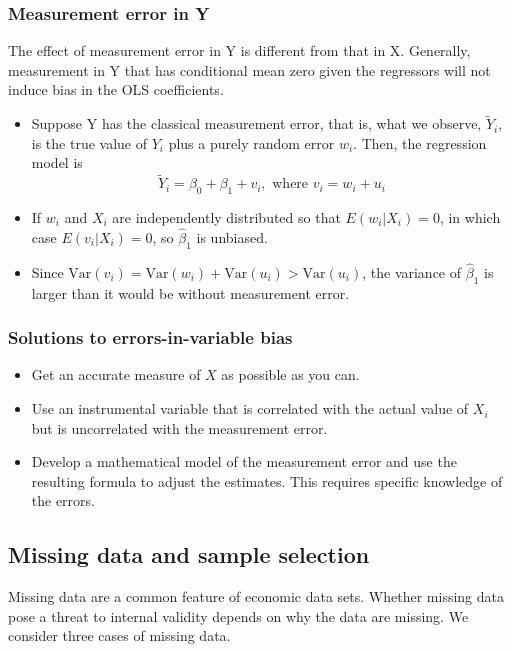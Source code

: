 \documentclass[a4paper,11pt]{article}
\newcommand{\var}{\mathrm{Var}}
\begin{document}
\subsubsection*{Measurement error in Y}
\label{sec:orgf6206d3}
The effect of measurement error in Y is different from that in
X. Generally, measurement in Y that has conditional mean zero given
the regressors will not induce bias in the OLS coefficients. 

\begin{itemize}
\item Suppose Y has the classical measurement error, that is, what we
observe, \(\tilde{Y}_i\), is the true value of \(Y_i\) plus a purely
random error \(w_i\). Then, the regression model is 
\[ \tilde{Y}_i = \beta_0 + \beta_1 + v_i, \text{ where } v_i = w_i +
  u_i\]
\item If \(w_i\) and \(X_i\) are independently distributed so that \(E(w_i | X_i)
  = 0\), in which case \(E(v_i | X_i) = 0\), so \(\hat{\beta}_1\) is
unbiased.
\item Since \(\var(v_i) = \var(w_i) + \var(u_i) > \var(u_i)\), the variance
of \(\hat{\beta}_1\) is larger than it would be without measurement
error.
\end{itemize}

\subsubsection*{Solutions to errors-in-variable bias}
\label{sec:org8ee290d}
\begin{itemize}
\item Get an accurate measure of \(X\) as possible as you can.
\item Use an instrumental variable that is correlated with the actual
value of \(X_i\) but is uncorrelated with the measurement error.
\item Develop a mathematical model of the measurement error and use the
resulting formula to adjust the estimates. This requires specific
knowledge of the errors.
\end{itemize}

\subsection{Missing data and sample selection}
\label{sec:org1b8bb82}
Missing data are a common feature of economic data sets. Whether
missing data pose a threat to internal validity depends on why the
data are missing. We consider three cases of missing data. 
\end{document}
